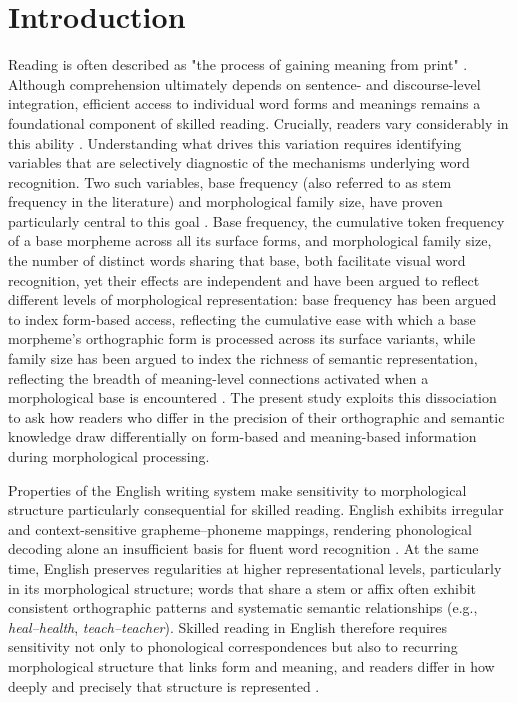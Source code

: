 \documentclass[utf8]{FrontiersinHarvard} %
\begin{document}
	\section{Introduction}
	
	Reading is often described as "the process of gaining meaning from print" \citep[][p.~34]{raynerHowPsychologicalScience2001}. Although comprehension ultimately depends on sentence- and discourse-level integration, efficient access to individual word forms and meanings remains a foundational component of skilled reading. Crucially, readers vary considerably in this ability \citep{perfettiReadingAbilityLexical2007, castlesHowDoesOrthographic2006, stanovichExposurePrintOrthographic1989}. Understanding what drives this variation requires identifying variables that are selectively diagnostic of the mechanisms underlying word recognition. Two such variables, base frequency (also referred to as stem frequency in the literature) and morphological family size, have proven particularly central to this goal \citep{taftMorphologicalDecompositionReverse2004, taftRecognitionAffixedWords1979, dejongMorphologicalFamilySize2000, bertramEffectsFamilySize2000}. Base frequency, the cumulative token frequency of a base morpheme across all its surface forms, and morphological family size, the number of distinct words sharing that base, both facilitate visual word recognition, yet their effects are independent and have been argued to reflect different levels of morphological representation: base frequency has been argued to index form-based access, reflecting the cumulative ease with which a base morpheme's orthographic form is processed across its surface variants, while family size has been argued to index the richness of semantic representation, reflecting the breadth of meaning-level connections activated when a morphological base is encountered \citep{schreuderHowComplexSimplex1997}. The present study exploits this dissociation to ask how readers who differ in the precision of their orthographic and semantic knowledge draw differentially on form-based and meaning-based information during morphological processing.
	
	Properties of the English writing system make sensitivity to morphological structure particularly consequential for skilled reading. English exhibits irregular and context-sensitive grapheme–phoneme mappings, rendering phonological decoding alone an insufficient basis for fluent word recognition \citep{zieglerReadingAcquisitionDevelopmental2005, castlesHowDoesOrthographic2006}. At the same time, English preserves regularities at higher representational levels, particularly in its morphological structure; words that share a stem or affix often exhibit consistent orthographic patterns and systematic semantic relationships (e.g., \textit{heal–health}, \textit{teach–teacher}). Skilled reading in English therefore requires sensitivity not only to phonological correspondences but also to recurring morphological structure that links form and meaning, and readers differ in how deeply and precisely that structure is represented \citep{bryantMorphologySpellingWhat2005, arciuliReadingStatisticalLearning2018, treimanStatisticalLearningSpelling2018}.
	
\end{document}
